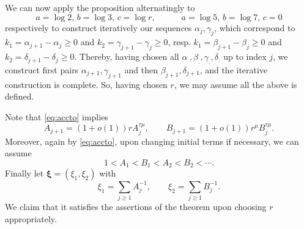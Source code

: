 \documentclass[10pt]{amsart}
\theoremstyle{definition}
\newcommand{\ux}{\boldsymbol{\xi}}
\newcommand{\N}{\mathbb{N}}
\begin{document}
We can now apply the proposition alternatingly
to
\[
a=\log 2, \, b=\log 3, \, c=\log r, \qquad\quad a=\log 5,\, b=\log 7, \, c=0
\]
respectively to construct iteratively our sequences $\alpha_j, \gamma_j$, which correspond to $k_1=\alpha_{j+1}-\alpha_j\ge 0$ and 
$k_2=\gamma_{j+1}-\gamma_j\ge 0$, resp. $k_1=\beta_{j+1}-\beta_j\ge 0$ and 
$k_2=\delta_{j+1}-\delta_j\ge 0$. 
Thereby, having chosen all $\alpha_., \beta_., \gamma_.,\delta_.$ up 
to index $j$, we construct first pairs $\alpha_{j+1}, \gamma_{j+1}$ and then $\beta_{j+1}, \delta_{j+1}$, and the iterative construction is complete.
So, having chosen $r$, we may assume all the above is defined.


Note that \eqref{eq:accto} implies 
\begin{equation}  \label{eq:true}
A_{j+1}=(1+o(1))r A_j^{\tau \mu}, \qquad B_{j+1} =(1+o(1))r^{\mu} B_j^{\tau \mu}.
\end{equation}
Moreover, again by \eqref{eq:accto}, upon changing initial terms if necessary, we can assume
\begin{equation} \label{eq:vf}
1<A_1 < B_1 < A_2 < B_2 < \cdots.
\end{equation}
Finally let $\ux=(\xi_1, \xi_2)$ with
\[
\xi_1= \sum_{j\ge 1} A_j^{-1 } , \qquad \xi_2= \sum_{j\ge 1} B_j^{-1 }.
\]
We claim that it satisfies the assertions of the theorem upon choosing $r$ appropriately.
\end{document}
